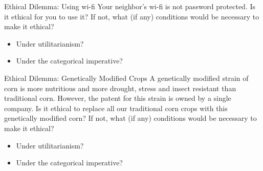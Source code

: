 \documentclass{beamer}
\begin{document}
\begin{frame}{Ethical Dilemma: Using wi-fi}
Your neighbor's wi-fi is not password protected. Is it ethical for you to use it? If not, what (if any) conditions would be necessary to make it ethical?
\bigskip
\begin{itemize}
\item Under utilitarianism?
\item Under the categorical imperative?
\end{itemize}
\end{frame}

\begin{frame}{Ethical Dilemma: Genetically Modified Crops}
A genetically modified strain of corn is more nutritious and more drought, stress and insect resistant than traditional corn. However, the patent for this strain is owned by a single company. Is it ethical to replace all our traditional corn crops with this genetically modified corn? If not, what (if any) conditions would be necessary to make it ethical?
\bigskip
\begin{itemize}
\item Under utilitarianism?
\item Under the categorical imperative?
\end{itemize}
\end{frame}
\end{document}
